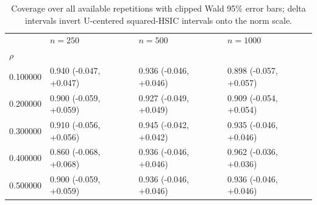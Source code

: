 \begin{table}
\caption{Coverage over all available repetitions with clipped Wald 95\% error bars; delta intervals invert U-centered squared-HSIC intervals onto the norm scale.}
\label{tab:experiment_details_delta_coverage_main}
\begin{tabular}{llll}
\toprule
 & $n=250$ & $n=500$ & $n=1000$ \\
$\rho$ &  &  &  \\
\midrule
0.100000 & 0.940 (-0.047, +0.047) & 0.936 (-0.046, +0.046) & 0.898 (-0.057, +0.057) \\
0.200000 & 0.900 (-0.059, +0.059) & 0.927 (-0.049, +0.049) & 0.909 (-0.054, +0.054) \\
0.300000 & 0.910 (-0.056, +0.056) & 0.945 (-0.042, +0.042) & 0.935 (-0.046, +0.046) \\
0.400000 & 0.860 (-0.068, +0.068) & 0.936 (-0.046, +0.046) & 0.962 (-0.036, +0.036) \\
0.500000 & 0.900 (-0.059, +0.059) & 0.936 (-0.046, +0.046) & 0.936 (-0.046, +0.046) \\
\bottomrule
\end{tabular}
\end{table}
